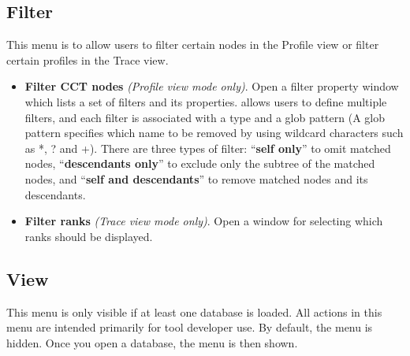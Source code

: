 \documentclass[english]{article}
\begin{document}
\subsection{Filter}
This menu is to allow users to filter certain nodes in the Profile view or filter certain profiles in the Trace view.
\begin{itemize}
 \item \textbf{Filter CCT nodes}  \emph{(Profile view mode only)}.
  Open a filter property window which lists a set of filters and its properties.
 allows  users to define multiple filters, and each filter is associated with a type and a glob pattern (A glob pattern specifies which name to be removed by using wildcard characters such as *, ? and +).
There are three types of filter: ``\textbf{self only}'' to omit matched nodes, 
``\textbf{descendants only}'' to exclude only the subtree of the matched nodes, and ``\textbf{self and descendants}'' to
remove matched nodes and its descendants.

 \item \textbf{Filter ranks} \emph{(Trace view mode only)}.
  Open a window for selecting which ranks should be displayed.

\end{itemize}


\subsection{View}
This menu is only visible if at least one database is loaded.
All actions in this menu are intended primarily for tool developer use. 
By default, the menu is hidden. Once you open a database, the menu is then shown.
\end{document}

